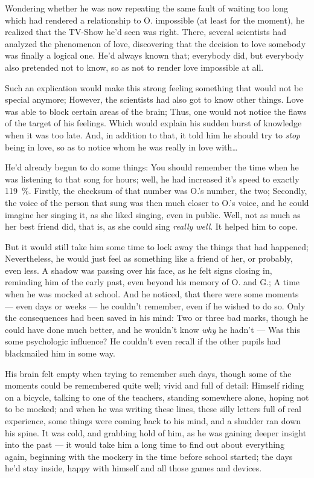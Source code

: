 Wondering whether he was now repeating the same fault of waiting too long which had rendered a relationship to O. impossible (at least for the moment), he realized that the TV-Show he'd seen was right. 
There, several scientists had analyzed the phenomenon of love, discovering that the decision to love somebody was finally a logical one. 
He'd always known that; everybody did, but everybody also pretended not to know, so as not to render love impossible at all.

Such an explication would make this strong feeling something that would not be special anymore; However, the scientists had also got to know other things. Love was able to block certain areas of the brain; Thus, one would not notice the flaws of the target of his feelings. 
Which would explain his sudden burst of knowledge when it was too late. And, in addition to that, it told him he should try to \emph{stop} being in love, so as to notice whom he was really in love with\ldots

He'd already begun to do some things: You should remember the time when he was listening to that song for hours; well, he had increased it's speed to exactly \SI{119}{\percent}. Firstly, the checksum of that number was O.'s number, the two; Secondly, the voice of the person that sung was then much closer to O.'s voice, and he could imagine her singing it, as she liked singing, even in public. Well, not as much as her best friend did, that is, as she could sing \emph{really well}. 
It helped him to cope.

But it would still take him some time to lock away the things that had happened; Nevertheless, he would just feel as something like a friend of her, or probably, even less. 
A shadow was passing over his face, as he felt signs closing in, reminding him of the early past, even beyond his memory of O. and G.; A time when he was mocked at school. 
And he noticed, that there were some moments --- even days or weeks --- he couldn't remember, even if he wished to do so. Only the consequences had been saved in his mind: Two or three bad marks, though he could have done much better, and he wouldn't know \emph{why} he hadn't --- Was this some psychologic influence? He couldn't even recall if the other pupils had blackmailed him in some way.

His brain felt empty when trying to remember such days, though some of the moments could be remembered quite well; vivid and full of detail: Himself riding on a bicycle, talking to one of the teachers, standing somewhere alone, hoping not to be mocked; and when he was writing these lines, these silly letters full of real experience, some things were coming back to his mind, and a shudder ran down his spine. 
It was cold, and grabbing hold of him, as he was gaining deeper insight into the past --- it would take him a long time to find out about everything again, beginning with the mockery in the time before school started; the days he'd stay inside, happy with himself and all those games and devices.

